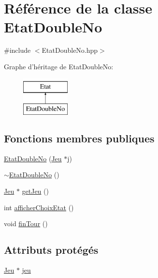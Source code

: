 \hypertarget{class_etat_double_no}{\section{\-Référence de la classe \-Etat\-Double\-No}
\label{class_etat_double_no}
}


{\ttfamily \#include $<$\-Etat\-Double\-No.\-hpp$>$}

\-Graphe d'héritage de \-Etat\-Double\-No\-:\begin{figure}[H]
\begin{center}
\leavevmode
\includegraphics[height=2.000000cm]{class_etat_double_no}
\end{center}
\end{figure}
\subsection*{\-Fonctions membres publiques}
\begin{DoxyCompactItemize}
\item 
\hyperlink{class_etat_double_no_ac89c20bba357b6fff0d3d8aeead6b894}{\-Etat\-Double\-No} (\hyperlink{class_jeu}{\-Jeu} $\ast$j)
\item 
\hyperlink{class_etat_double_no_a5833701f2f11e8902ceb31626076dd2e}{$\sim$\-Etat\-Double\-No} ()
\item 
\hyperlink{class_jeu}{\-Jeu} $\ast$ \hyperlink{class_etat_double_no_a51f05fabae25436634e3b8c1ecdf5aef}{get\-Jeu} ()
\item 
int \hyperlink{class_etat_double_no_a01af5700d0b3bd927af0d65f95395256}{afficher\-Choix\-Etat} ()
\item 
void \hyperlink{class_etat_double_no_a888b25f87b975d3d92bfaa2cf9ce064d}{fin\-Tour} ()
\end{DoxyCompactItemize}
\subsection*{\-Attributs protégés}
\begin{DoxyCompactItemize}
\item 
\hyperlink{class_jeu}{\-Jeu} $\ast$ \hyperlink{class_etat_double_no_ac1166f725800d6a7f9c0c83bf6d7665e}{jeu}
\end{DoxyCompactItemize}


